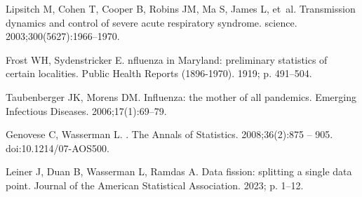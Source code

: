 \documentclass[10pt,letterpaper]{article}
\begin{document}
\begin{thebibliography}{10}
  Lipsitch M, Cohen T, Cooper B, Robins JM, Ma S, James L, et~al.
  \newblock Transmission dynamics and control of severe acute respiratory
    syndrome.
  \newblock science. 2003;300(5627):1966--1970.
  
  Frost WH, Sydenstricker E.
  nfluenza in {M}aryland: preliminary statistics of certain
    localities.
  \newblock Public Health Reports (1896-1970). 1919; p. 491--504.
  
  Taubenberger JK, Morens DM.
   {I}nfluenza: the mother of all pandemics.
  \newblock Emerging Infectious Diseases. 2006;17(1):69--79.
  
  Genovese C, Wasserman L.
  .
  \newblock The Annals of Statistics. 2008;36(2):875 -- 905.
  \newblock doi:{10.1214/07-AOS500}.
  
  Leiner J, Duan B, Wasserman L, Ramdas A.
  \newblock Data fission: splitting a single data point.
  \newblock Journal of the American Statistical Association. 2023; p. 1--12.
  
  \end{thebibliography}
  
%

 


\end{document}

